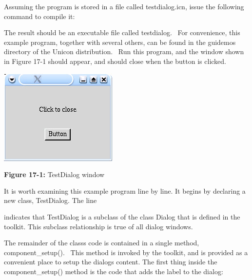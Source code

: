 Assuming the program is stored in a file called \textsf{testdialog.icn},
issue the following command to compile it:


The result should be an executable file called \textsf{testdialog}.
\ For convenience, this example program, together with several others,
can be found in the \textsf{guidemos} directory of the Unicon
distribution. \ Run this program, and the window shown in Figure 17-1
should appear, and should close when the button is
clicked.

\bigskip

\begin{center}
\includegraphics[width=2.3126in,height=1.8752in]{ub-img/ub-img50.jpg}
\end{center}

{\sffamily\bfseries Figure 17-1:}
{\sffamily TestDialog window}

\bigskip

It is worth examining this example program line by line. It begins by
declaring a new class, \textsf{TestDialog}. The line


\noindent
indicates that \textsf{TestDialog} is a subclass of the
class \textsf{Dialog} that is defined in the toolkit. This subclass
relationship is true of all dialog windows. 

The remainder of the class{\textquotesingle}s code is contained in a
single method, \textsf{component\_setup(). \ }This method is invoked by
the toolkit, and is provided as a convenient place to setup the
dialog{\textquotesingle}s content. The first thing inside the
\textsf{component\_setup()} method is the code that adds the label to
the dialog: 


